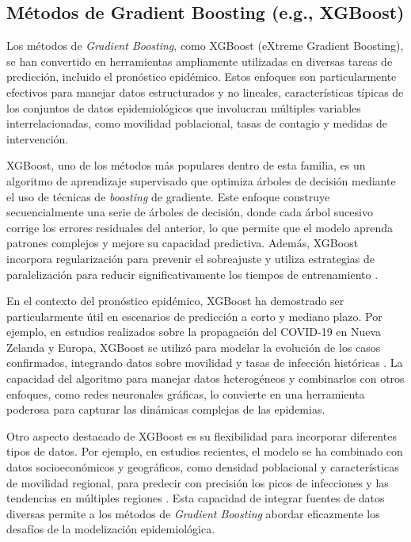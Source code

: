 \subsection{Métodos de Gradient Boosting (e.g., XGBoost)}\label{section:gradient-boosting}

Los métodos de \textit{Gradient Boosting}, como XGBoost (eXtreme Gradient Boosting), se han convertido en herramientas ampliamente utilizadas en diversas tareas de predicción, incluido el pronóstico epidémico. Estos enfoques son particularmente efectivos para manejar datos estructurados y no lineales, características típicas de los conjuntos de datos epidemiológicos que involucran múltiples variables interrelacionadas, como movilidad poblacional, tasas de contagio y medidas de intervención.

XGBoost, uno de los métodos más populares dentro de esta familia, es un algoritmo de aprendizaje supervisado que optimiza árboles de decisión mediante el uso de técnicas de \textit{boosting} de gradiente. Este enfoque construye secuencialmente una serie de árboles de decisión, donde cada árbol sucesivo corrige los errores residuales del anterior, lo que permite que el modelo aprenda patrones complejos y mejore su capacidad predictiva. Además, XGBoost incorpora regularización para prevenir el sobreajuste y utiliza estrategias de paralelización para reducir significativamente los tiempos de entrenamiento \cite{Nguyen2023, Baccega2024}.

En el contexto del pronóstico epidémico, XGBoost ha demostrado ser particularmente útil en escenarios de predicción a corto y mediano plazo. Por ejemplo, en estudios realizados sobre la propagación del COVID-19 en Nueva Zelanda y Europa, XGBoost se utilizó para modelar la evolución de los casos confirmados, integrando datos sobre movilidad y tasas de infección históricas \cite{Nguyen2023, Panagopoulos2021}. La capacidad del algoritmo para manejar datos heterogéneos y combinarlos con otros enfoques, como redes neuronales gráficas, lo convierte en una herramienta poderosa para capturar las dinámicas complejas de las epidemias.

Otro aspecto destacado de XGBoost es su flexibilidad para incorporar diferentes tipos de datos. Por ejemplo, en estudios recientes, el modelo se ha combinado con datos socioeconómicos y geográficos, como densidad poblacional y características de movilidad regional, para predecir con precisión los picos de infecciones y las tendencias en múltiples regiones \cite{Nguyen2023, Baccega2024}. Esta capacidad de integrar fuentes de datos diversas permite a los métodos de \textit{Gradient Boosting} abordar eficazmente los desafíos de la modelización epidemiológica.

